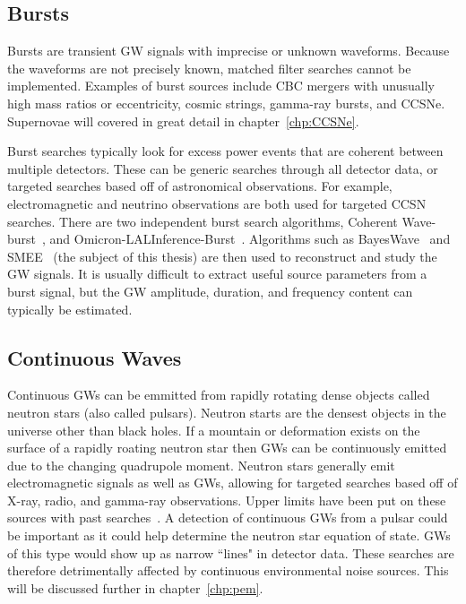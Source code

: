 \subsection{Bursts}

Bursts are transient GW signals with imprecise or unknown waveforms. Because the waveforms are not precisely known, matched filter searches cannot be implemented. Examples of burst sources include CBC mergers with unusually high mass ratios or eccentricity, cosmic strings, gamma-ray bursts, and CCSNe. Supernovae will covered in great detail in chapter~\ref{chp:CCSNe}.

Burst searches typically look for excess power events that are coherent between multiple detectors. These can be generic searches through all detector data, or targeted searches based off of astronomical observations. For example, electromagnetic and neutrino observations are both used for targeted CCSN searches. There are two independent burst search algorithms, Coherent Wave-burst~\cite{klimenko2008coherent}, and Omicron-LALInference-Burst~\cite{lynch2017information}. Algorithms such as BayesWave~\cite{cornish2015bayeswave} and SMEE~\cite{roma2019astrophysics} (the subject of this thesis) are then used to reconstruct and study the GW signals. It is usually difficult to extract useful source parameters from a burst signal, but the GW amplitude, duration, and frequency content can typically be estimated.

\subsection{Continuous Waves}

Continuous GWs can be emmitted from rapidly rotating dense objects called neutron stars (also called pulsars). Neutron starts are the densest objects in the universe other than black holes. If a mountain or deformation exists on the surface of a rapidly roating neutron star then GWs can be continuously emitted due to the changing quadrupole moment. Neutron stars generally emit electromagnetic signals as well as GWs, allowing for targeted searches based off of X-ray, radio, and gamma-ray observations. Upper limits have been put on these sources with past searches~\cite{abbott2017first}. A detection of continuous GWs from a pulsar could be important as it could help determine the neutron star equation of state. GWs of this type would show up as narrow ``lines" in detector data. These searches are therefore detrimentally affected by continuous environmental noise sources.  This will be discussed further in chapter~\ref{chp:pem}.

